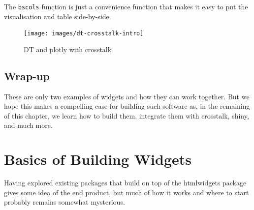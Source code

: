 \documentclass[
  10pt,
]{krantz}
\makeatletter
\newenvironment{Shaded}{\begin{snugshade}}{\end{snugshade}}
\newcommand{\DataTypeTok}[1]{\textcolor[rgb]{0.27,0.27,0.27}{#1}}
\newcommand{\KeywordTok}[1]{\textcolor[rgb]{0.27,0.27,0.27}{\textbf{#1}}}
\newcommand{\NormalTok}[1]{#1}
\newcommand{\OperatorTok}[1]{\textcolor[rgb]{0.43,0.43,0.43}{\textbf{#1}}}
\newcommand{\StringTok}[1]{\textcolor[rgb]{0.5,0.5,0.5}{#1}}
\newenvironment{kframe}{%
\medskip{}
\setlength{\fboxsep}{.8em}
 \def\at@end@of@kframe{}%
 \ifinner\ifhmode%
  \def\at@end@of@kframe{\end{minipage}}%
  \begin{minipage}{\columnwidth}%
 \fi\fi%
 \def\FrameCommand##1{\hskip\@totalleftmargin \hskip-\fboxsep
 \colorbox{shadecolor}{##1}\hskip-\fboxsep
     \hskip-\linewidth \hskip-\@totalleftmargin \hskip\columnwidth}%
 \MakeFramed {\advance\hsize-\width
   \@totalleftmargin\z@ \linewidth\hsize
   \@setminipage}}%
 {\par\unskip\endMakeFramed%
 \at@end@of@kframe}
\renewenvironment{Shaded}{\begin{kframe}}{\end{kframe}}
\makeatother
\begin{document}
The \texttt{bscols} function is just a convenience function that makes it easy to put the visualisation and table side-by-side.

\begin{Shaded}
\end{Shaded}

\begin{figure}[H]

{\centering \texttt{[image: images/dt-crosstalk-intro]} 

}

\caption{DT and plotly with crosstalk}\label{fig:dt-example-crosstalk}
\end{figure}

\hypertarget{widgets-intro-conclude}{%
\section{Wrap-up}\label{widgets-intro-conclude}}

These are only two examples of widgets and how they can work together. But we hope this makes a compelling case for building such software as, in the remaining of this chapter, we learn how to build them, integrate them with crosstalk, shiny, and much more.

\hypertarget{widgets-basics}{%
\chapter{Basics of Building Widgets}\label{widgets-basics}}

Having explored existing packages that build on top of the htmlwidgets package gives some idea of the end product, but much of how it works and where to start probably remains somewhat mysterious.
\end{document}
